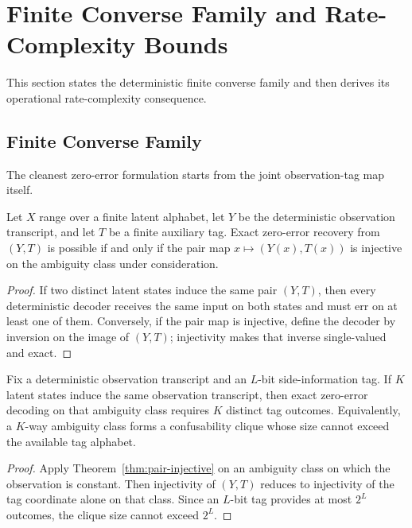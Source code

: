 \section{Finite Converse Family and Rate-Complexity Bounds}\label{sec:bounds}

This section states the deterministic finite converse family and then derives its operational rate-complexity consequence.

\subsection{Finite Converse Family}\label{sec:finite-converse-family}

The cleanest zero-error formulation starts from the joint observation-tag map itself.

\begin{theorem}\label{thm:pair-injective}
Let $X$ range over a finite latent alphabet, let $Y$ be the deterministic observation transcript, and let $T$ be a finite auxiliary tag. Exact zero-error recovery from $(Y,T)$ is possible if and only if the pair map $x \mapsto (Y(x),T(x))$ is injective on the ambiguity class under consideration.
\end{theorem}

\begin{proof}
If two distinct latent states induce the same pair $(Y,T)$, then every deterministic decoder receives the same input on both states and must err on at least one of them. Conversely, if the pair map is injective, define the decoder by inversion on the image of $(Y,T)$; injectivity makes that inverse single-valued and exact.
\end{proof}

\begin{theorem}\label{thm:confusability-converse}
Fix a deterministic observation transcript and an $L$-bit side-information tag. If $K$ latent states induce the same observation transcript, then exact zero-error decoding on that ambiguity class requires $K$ distinct tag outcomes. Equivalently, a $K$-way ambiguity class forms a confusability clique whose size cannot exceed the available tag alphabet.
\end{theorem}

\begin{proof}
Apply Theorem~\ref{thm:pair-injective} on an ambiguity class on which the observation is constant. Then injectivity of $(Y,T)$ reduces to injectivity of the tag coordinate alone on that class. Since an $L$-bit tag provides at most $2^L$ outcomes, the clique size cannot exceed $2^L$.
\end{proof}

